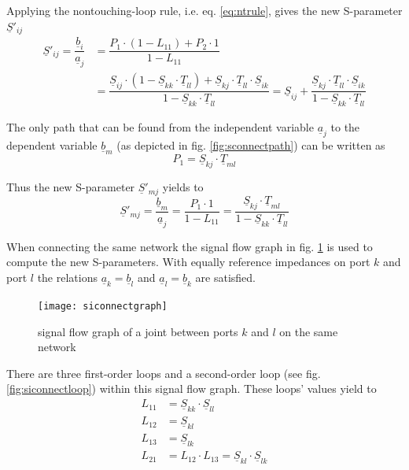 \documentclass[10pt]{report}
\begin{document}
Applying the nontouching-loop rule, i.e. eq. \eqref{eq:ntrule}, gives
the new S-parameter $\underline{S}'_{ij}$
\begin{equation}
\begin{split}
\underline{S}'_{ij} = \dfrac{\underline{b}_{i}}{\underline{a}_{j}} &= \dfrac{P_{1}\cdot\left(1 - L_{11}\right) + P_{2}\cdot 1}{1 - L_{11}}\\
&= \dfrac{\underline{S}_{ij}\cdot\left(1 - \underline{S}_{kk}\cdot \underline{T}_{ll}\right) + \underline{S}_{kj}\cdot \underline{T}_{ll}\cdot \underline{S}_{ik}}{1 - \underline{S}_{kk}\cdot \underline{T}_{ll}}
= \underline{S}_{ij} + \dfrac{\underline{S}_{kj}\cdot \underline{T}_{ll}\cdot \underline{S}_{ik}}{1 - \underline{S}_{kk}\cdot \underline{T}_{ll}}
\end{split}
\end{equation}

The only path that can be found from the independent variable
$\underline{a}_{j}$ to the dependent variable $\underline{b}_{m}$ (as
depicted in fig. \ref{fig:sconnectpath}) can be written as
\begin{equation}
P_{1} = \underline{S}_{kj}\cdot \underline{T}_{ml}
\end{equation}

Thus the new S-parameter $\underline{S}'_{mj}$ yields to
\begin{equation}
\underline{S}'_{mj} = \dfrac{\underline{b}_{m}}{\underline{a}_{j}} 
= \dfrac{P_{1}\cdot 1}{1 - L_{11}}
= \dfrac{\underline{S}_{kj}\cdot \underline{T}_{ml}}{1 - \underline{S}_{kk}\cdot \underline{T}_{ll}}
\end{equation}

When connecting the same network the signal flow graph in
fig. \ref{fig:siconnectgraph} is used to compute the new S-parameters.
With equally reference impedances on port $k$ and port $l$ the
relations $\underline{a}_{k} = \underline{b}_{l}$ and
$\underline{a}_{l} = \underline{b}_{k}$ are satisfied.

\begin{figure}[ht]
\begin{center}
\texttt{[image: siconnectgraph]}
\end{center}
\caption{signal flow graph of a joint between ports $k$ and $l$ on the same network}
\label{fig:siconnectgraph}
\end{figure}
\FloatBarrier

There are three first-order loops and a second-order loop (see
fig. \ref{fig:siconnectloop}) within this signal flow graph.  These
loops' values yield to
\begin{align}
L_{11} &= \underline{S}_{kk}\cdot \underline{S}_{ll}\\
L_{12} &= \underline{S}_{kl}\\
L_{13} &= \underline{S}_{lk}\\
L_{21} &= L_{12}\cdot L_{13} = \underline{S}_{kl}\cdot \underline{S}_{lk}
\end{align}
\end{document}
